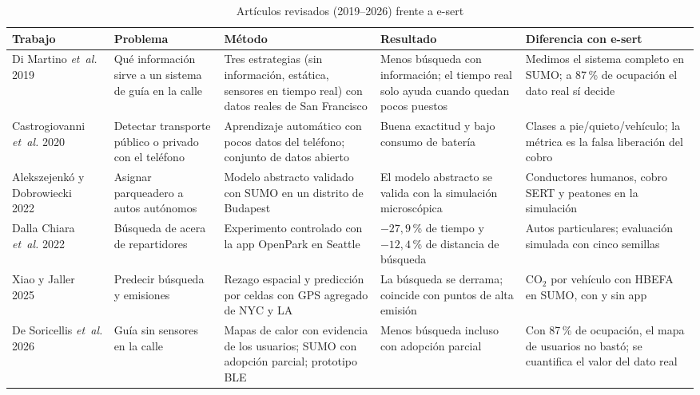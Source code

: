 \documentclass[conference]{IEEEtran}
\begin{document}
\begin{table}[t]
\centering
\caption{Artículos revisados (2019--2026) frente a e-sert}
\label{tab:arte}
\footnotesize
\begin{tabularx}{\textwidth}{@{}p{2.6cm}XXXX@{}}
\toprule
Trabajo & Problema & Método & Resultado & Diferencia con e-sert \\
\midrule
Di Martino \emph{et~al.} 2019~\cite{dimartino2019comparing} & Qué información sirve a un sistema de guía en la calle & Tres estrategias (sin información, estática, sensores en tiempo real) con datos reales de San Francisco & Menos búsqueda con información; el tiempo real solo ayuda cuando quedan pocos puestos & Medimos el sistema completo en SUMO; a 87\,\% de ocupación el dato real sí decide \\
Castrogiovanni \emph{et~al.} 2020~\cite{castrogiovanni2020smartphone} & Detectar transporte público o privado con el teléfono & Aprendizaje automático con pocos datos del teléfono; conjunto de datos abierto & Buena exactitud y bajo consumo de batería & Clases a pie/quieto/vehículo; la métrica es la falsa liberación del cobro \\
Alekszejenkó y Dobrowiecki 2022~\cite{alekszejenko2022validating} & Asignar parqueadero a autos autónomos & Modelo abstracto validado con SUMO en un distrito de Budapest & El modelo abstracto se valida con la simulación microscópica & Conductores humanos, cobro SERT y peatones en la simulación \\
Dalla Chiara \emph{et~al.} 2022~\cite{dallachiara2022curb} & Búsqueda de acera de repartidores & Experimento controlado con la app OpenPark en Seattle & $-27{,}9$\,\% de tiempo y $-12{,}4$\,\% de distancia de búsqueda & Autos particulares; evaluación simulada con cinco semillas \\
Xiao y Jaller 2025~\cite{xiao2025prediction} & Predecir búsqueda y emisiones & Rezago espacial y predicción por celdas con GPS agregado de NYC y LA & La búsqueda se derrama; coincide con puntos de alta emisión & CO$_2$ por vehículo con HBEFA en SUMO, con y sin app \\
De Soricellis \emph{et~al.} 2026~\cite{desoricellis2026cooperative} & Guía sin sensores en la calle & Mapas de calor con evidencia de los usuarios; SUMO con adopción parcial; prototipo BLE & Menos búsqueda incluso con adopción parcial & Con 87\,\% de ocupación, el mapa de usuarios no bastó; se cuantifica el valor del dato real \\
\bottomrule
\end{tabularx}
\end{table}
\end{document}
